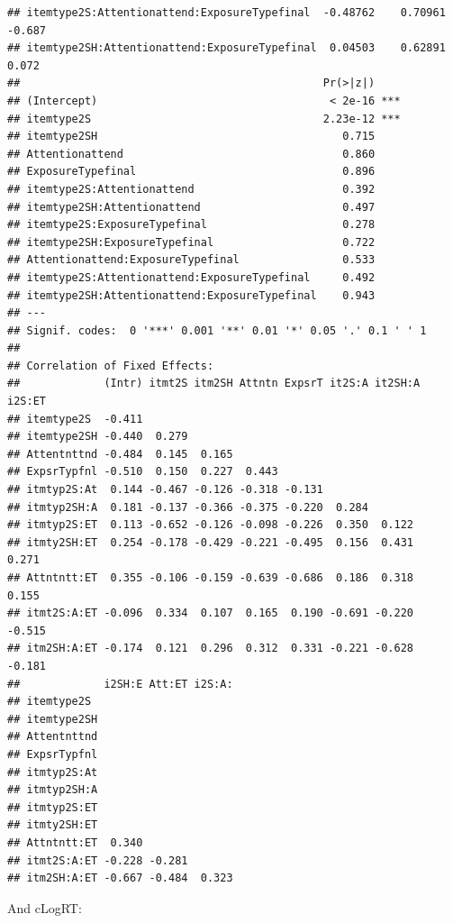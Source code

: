 \documentclass[11pt]{article}\usepackage[]{graphicx}\usepackage[]{color}
\makeatletter
\newenvironment{kframe}{%
 \def\at@end@of@kframe{}%
 \ifinner\ifhmode%
  \def\at@end@of@kframe{\end{minipage}}%
  \begin{minipage}{\columnwidth}%
 \fi\fi%
 \def\FrameCommand##1{\hskip\@totalleftmargin \hskip-\fboxsep
 \colorbox{shadecolor}{##1}\hskip-\fboxsep
     \hskip-\linewidth \hskip-\@totalleftmargin \hskip\columnwidth}%
 \MakeFramed {\advance\hsize-\width
   \@totalleftmargin\z@ \linewidth\hsize
   \@setminipage}}%
 {\par\unskip\endMakeFramed%
 \at@end@of@kframe}
\newenvironment{knitrout}{}{} %
\makeatother
\begin{document}
\begin{knitrout}
\begin{kframe}
\begin{verbatim}
## itemtype2S:Attentionattend:ExposureTypefinal  -0.48762    0.70961  -0.687
## itemtype2SH:Attentionattend:ExposureTypefinal  0.04503    0.62891   0.072
##                                               Pr(>|z|)    
## (Intercept)                                    < 2e-16 ***
## itemtype2S                                    2.23e-12 ***
## itemtype2SH                                      0.715    
## Attentionattend                                  0.860    
## ExposureTypefinal                                0.896    
## itemtype2S:Attentionattend                       0.392    
## itemtype2SH:Attentionattend                      0.497    
## itemtype2S:ExposureTypefinal                     0.278    
## itemtype2SH:ExposureTypefinal                    0.722    
## Attentionattend:ExposureTypefinal                0.533    
## itemtype2S:Attentionattend:ExposureTypefinal     0.492    
## itemtype2SH:Attentionattend:ExposureTypefinal    0.943    
## ---
## Signif. codes:  0 '***' 0.001 '**' 0.01 '*' 0.05 '.' 0.1 ' ' 1
## 
## Correlation of Fixed Effects:
##             (Intr) itmt2S itm2SH Attntn ExpsrT it2S:A it2SH:A i2S:ET
## itemtype2S  -0.411                                                  
## itemtype2SH -0.440  0.279                                           
## Attentnttnd -0.484  0.145  0.165                                    
## ExpsrTypfnl -0.510  0.150  0.227  0.443                             
## itmtyp2S:At  0.144 -0.467 -0.126 -0.318 -0.131                      
## itmtyp2SH:A  0.181 -0.137 -0.366 -0.375 -0.220  0.284               
## itmtyp2S:ET  0.113 -0.652 -0.126 -0.098 -0.226  0.350  0.122        
## itmty2SH:ET  0.254 -0.178 -0.429 -0.221 -0.495  0.156  0.431   0.271
## Attntntt:ET  0.355 -0.106 -0.159 -0.639 -0.686  0.186  0.318   0.155
## itmt2S:A:ET -0.096  0.334  0.107  0.165  0.190 -0.691 -0.220  -0.515
## itm2SH:A:ET -0.174  0.121  0.296  0.312  0.331 -0.221 -0.628  -0.181
##             i2SH:E Att:ET i2S:A:
## itemtype2S                      
## itemtype2SH                     
## Attentnttnd                     
## ExpsrTypfnl                     
## itmtyp2S:At                     
## itmtyp2SH:A                     
## itmtyp2S:ET                     
## itmty2SH:ET                     
## Attntntt:ET  0.340              
## itmt2S:A:ET -0.228 -0.281       
## itm2SH:A:ET -0.667 -0.484  0.323
\end{verbatim}
\end{kframe}
\end{knitrout}

And cLogRT:
\end{document}
